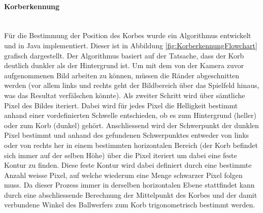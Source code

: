 	\paragraph{Korberkennung}$~~$\vspace{2mm}\\
		Für die Bestimmung der Position des Korbes wurde ein Algorithmus entwickelt und in Java implementiert. Dieser ist in Abbildung \ref{fig:KorberkennungFlowchart} grafisch dargestellt.
		Der Algorithmus basiert auf der Tatsache, dass der Korb deutlich dunkler als der Hintergrund ist. 
		Um mit dem von der Kamera zuvor aufgenommenen Bild arbeiten zu können, müssen die Ränder abgeschnitten werden 
		(vor allem links und rechts geht der Bildbereich über das Spielfeld hinaus, was das Resultat verfälschen könnte). 
		Als zweiter Schritt wird über sämtliche Pixel des Bildes iteriert. Dabei wird für jedes Pixel die Helligkeit bestimmt 
		anhand einer vordefinierten Schwelle entschieden, ob es zum Hintergrund (heller) oder zum Korb (dunkel) gehört. 
		Anschliessend wird der Schwerpunkt der dunklen Pixel bestimmt und anhand des gefundenen Schwerpunktes entweder
		von links oder von rechts her in einem bestimmten horizontalen Bereich (der Korb befindet sich immer auf der selben Höhe)
		über die Pixel iteriert um dabei eine feste Kontur zu finden. Diese feste Kontur wird dabei definiert durch eine
		bestimmte Anzahl weisse Pixel, auf welche wiederum eine Menge schwarzer Pixel folgen muss. 
		Da dieser Prozess immer in derselben horizontalen Ebene stattfindet kann durch eine abschliessende Berechnung 
		der Mittelpunkt des Korbes und der damit verbundene Winkel des Ballwerfers zum Korb trigonometrisch bestimmt werden.
